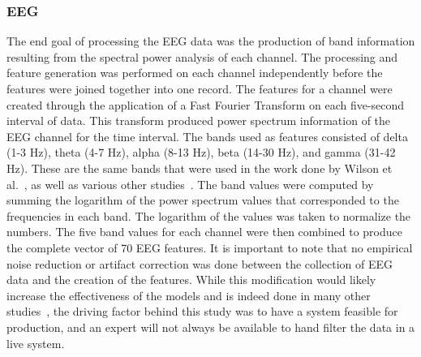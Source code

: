 \documentclass[11pt]{article}
\begin{document}
		\subsubsection{EEG}
		The end goal of processing the EEG data was the production of band information resulting from the spectral power analysis of each channel.  The processing and feature generation was performed on each channel independently before the features were joined together into one record. The features for a channel were created through the application of a Fast Fourier Transform on each five-second interval of data. This transform produced power spectrum information of the EEG channel for the time interval. The bands used as features consisted of delta (1-3 Hz), theta (4-7 Hz), alpha (8-13 Hz), beta (14-30 Hz), and gamma (31-42 Hz). These are the same bands that were used in the work done by Wilson et al.~\cite{Wilson}, as well as various other studies~\cite{Estepp_2015, Wilson_2012}. The band values were computed by summing the logarithm of the power spectrum values that corresponded to the frequencies in each band. The logarithm of the values was taken to normalize the numbers. The five band values for each channel were then combined to produce the complete vector of 70 EEG features. It is important to note that no empirical noise reduction or artifact correction was done between the collection of EEG data and the creation of the features. While this modification would likely increase the effectiveness of the models and is indeed done in many other studies~\cite{Estepp_2015,Ting, Smith}, the driving factor behind this study was to have a system feasible for production, and an expert will not always be available to hand filter the data in a live system. 
			
\end{document}
